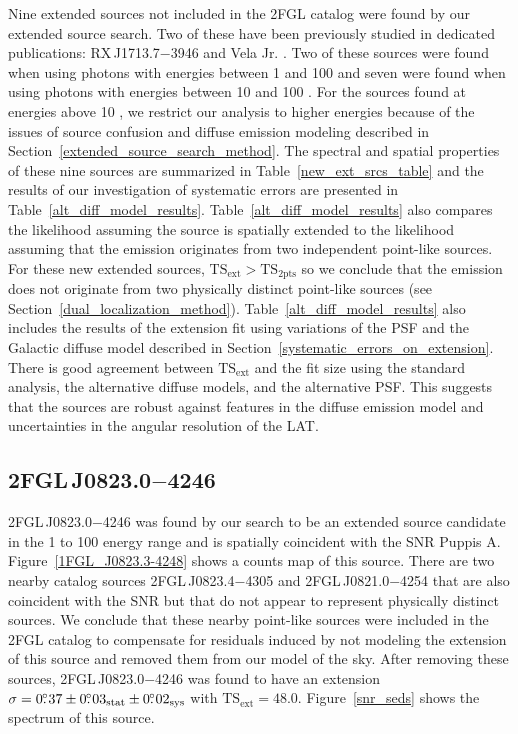 \documentclass[12pt,preprint]{aastex}
\newcommand{\gev}{\text{GeV}\xspace}
\newcommand{\tsext}{{\ensuremath{\text{TS}_{\text{ext}}}}\xspace}
\newcommand{\tsinc}{\ensuremath{\text{TS}_{\text{2pts}}}\xspace}
\newcommand{\sys}{\text{sys}\xspace}
\newcommand{\stat}{\text{stat}\xspace}
\begin{document}
Nine extended sources not included in the 2FGL catalog were found by our
extended source search. Two of these have been previously
studied in dedicated publications: RX\,J1713.7$-$3946 and Vela
Jr. \citep{rx_j1713_lat,vela_jr_lat}.
Two of these sources were
found when using photons with energies between 1 \gev and 100 \gev and seven
were found when using photons with energies between 10 \gev and 100 \gev.
For the sources found at energies above 10 \gev, we restrict our
analysis to higher energies because of the issues
of source confusion and diffuse emission modeling described in
Section~\ref{extended_source_search_method}.
The spectral and spatial properties of these nine sources are summarized
in Table~\ref{new_ext_srcs_table} and the results of our investigation of
systematic errors are presented in Table~\ref{alt_diff_model_results}.
Table~\ref{alt_diff_model_results}
also
compares the likelihood assuming the source is spatially
extended to the likelihood assuming 
that the emission originates from two independent point-like
sources. For these new extended sources, $\tsext>\tsinc$ 
so we conclude that 
the \gev emission does not originate from two physically
distinct point-like sources (see Section~\ref{dual_localization_method}).  
Table~\ref{alt_diff_model_results} also includes the
results of the extension fit using variations of the PSF and the Galactic
diffuse model described in Section~\ref{systematic_errors_on_extension}.
There is good agreement between \tsext and the fit size using the standard
analysis, the alternative diffuse models, and the alternative PSF.
This suggests that the sources are robust against features in the diffuse
emission model and uncertainties in the angular resolution of the LAT.

\subsection{2FGL\,J0823.0$-$4246}
\label{section_2FGL_J0823.0-4246}


2FGL\,J0823.0$-$4246 was found by our search to be an extended source
candidate in the 1 \gev to 100 \gev energy range and is spatially
coincident with the SNR Puppis A.  Figure~\ref{1FGL_J0823.3-4248} shows
a counts map of this source. There are two nearby catalog sources 2FGL\,J0823.4$-$4305
and 2FGL\,J0821.0$-$4254 that are also coincident with the SNR but that
do not appear to represent physically distinct sources.
We conclude that
these nearby point-like sources
were included in the 2FGL catalog to compensate for residuals induced
by not modeling the extension of this source and
removed them from our model of the sky.
After removing these sources, 2FGL\,J0823.0$-$4246 was found to have an extension 
$\sigma=0\fdg37\pm0\fdg03_\stat\pm0\fdg02_\sys$ with 
$\tsext=48.0$.  Figure~\ref{snr_seds} shows the spectrum of
this source.
\end{document}
